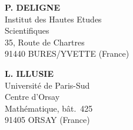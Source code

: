 \documentclass[10pt]{article}
\begin{document}
\vfill
\begin{minipage}[t]{0.46\textwidth}
\textbf{P. DELIGNE}\\
Institut des Hautes Etudes\\
Scientifiques\\
35, Route de Chartres\\
91440 BURES/YVETTE (France)
\end{minipage}\hfill
\begin{minipage}[t]{0.46\textwidth}
\textbf{L. ILLUSIE}\\
Université de Paris-Sud\\
Centre d'Orsay\\
Mathématique, bât.~425\\
91405 ORSAY (France)
\end{minipage}
\newpage
\setcounter{footnote}{0}
\fontsize{10.2pt}{12.04pt}\selectfont
\end{document}
